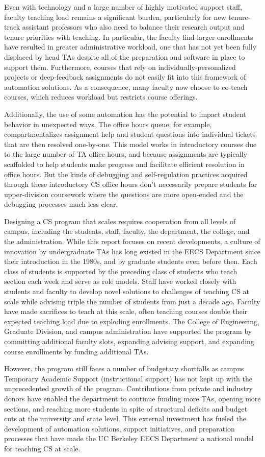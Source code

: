 Even with technology and a large number of highly motivated support staff, faculty teaching load remains a significant burden, particularly for new tenure-track assistant professors who also need to balance their research output and tenure priorities with teaching. In particular, the faculty find larger enrollments have resulted in greater administrative workload, one that has not yet been fully displaced by head TAs despite all of the preparation and software in place to support them. Furthermore, courses that rely on individually-personalized projects or deep-feedback assignments do not easily fit into this framework of automation solutions. As a consequence, many faculty now choose to co-teach courses, which reduces workload but restricts course offerings.

Additionally, the use of some automation has the potential to impact student behavior in unexpected ways. The office hours queue, for example, compartmentalizes assignment help and student questions into individual tickets that are then resolved one-by-one. This model works in introductory courses due to the large number of TA office hours, and because assignments are typically scaffolded to help students make progress and facilitate efficient resolution in office hours. But the kinds of debugging and self-regulation practices acquired through these introductory CS office hours don't necessarily prepare students for upper-division coursework where the questions are more open-ended and the debugging processes much less clear.

Designing a CS program that scales requires cooperation from all levels of campus, including the students, staff, faculty, the department, the college, and the administration. While this report focuses on recent developments, a culture of innovation by undergraduate TAs has long existed in the EECS Department since their introduction in the 1980s, and by graduate students even before then. Each class of students is supported by the preceding class of students who teach section each week and serve as role models. Staff have worked closely with students and faculty to develop novel solutions to challenges of teaching CS at scale while advising triple the number of students from just a decade ago. Faculty have made sacrifices to teach at this scale, often teaching courses double their expected teaching load due to exploding enrollments. The College of Engineering, Graduate Division, and campus administration have supported the program by committing additional faculty slots, expanding advising support, and expanding course enrollments by funding additional TAs.

However, the program still faces a number of budgetary shortfalls as campus Temporary Academic Support (instructional support) has not kept up with the unprecedented growth of the program. Contributions from private and industry donors have enabled the department to continue funding more TAs, opening more sections, and reaching more students in spite of structural deficits and budget cuts at the university and state level. This external investment has fueled the development of automation solutions, support initiatives, and preparation processes that have made the UC Berkeley EECS Department a national model for teaching CS at scale.
